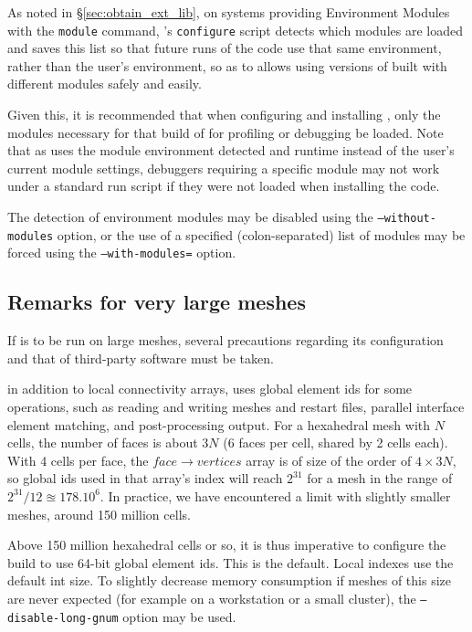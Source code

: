 \documentclass[a4paper,10pt,twoside]{csshortdoc}
\begin{document}
As noted in \S\ref{sec:obtain_ext_lib}, on systems providing
Environment Modules with the {\tt module} command, \CS's {\tt configure}
script detects which modules are loaded and saves
this list so that future runs of the code use that same environment,
rather than the user's environment, so as to allows using versions of
\CS built with different modules safely and easily.

Given this, it is recommended that when configuring and installing
\CS, only the modules necessary for that build of for
profiling or debugging be loaded. Note that as \CS uses the module
environment detected and runtime instead of the user's current
module settings, debuggers requiring a specific module may
not work under a standard run script if they were not loaded when
installing the code.

The detection of environment modules may be disabled using the
\texttt{--without-modules} option,
or the use of a specified (colon-separated) list of modules
may be forced using the \texttt{--with-modules=} option.

\subsection{Remarks for very large meshes\label{sec:config:largemesh}}

If \CS is to be run on large meshes, several precautions regarding
its configuration and that of third-party software must be taken.

in addition to local connectivity arrays, \CS uses global element ids
for some operations, such as reading and writing meshes and restart files,
parallel interface element matching, and post-processing output.
For a hexahedral mesh with $N$ cells,
the number of faces is about $3N$ (6 faces per cell, shared by 2 cells each).
With 4 cells per face, the $face \rightarrow vertices$ array is of size
of the order of $4\times3N$, so global ids used in that array's index
will reach $2^{31}$ for a mesh in the range of $2^{31} / 12 \approxeq 178.10^6$.
In practice, we have encountered a limit with slightly smaller meshes,
around 150 million cells.

Above 150 million hexahedral cells or so, it is thus imperative to configure
the build to use 64-bit global element ids. This is the default.
Local indexes use the default {int} size. To slightly decrease memory
consumption if meshes of this size are never expected (for example on a workstation
or a small cluster), the {\tt --disable-long-gnum} option may be used.
\end{document}
